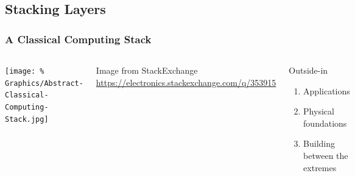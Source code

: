 \documentclass[handout]{beamer}
\begin{document}
\subsection{Stacking Layers}
\begin{frame}
  \frametitle{A Classical Computing Stack}

  \begin{columns}
    \texttt{[image: \%
      Graphics/Abstract-Classical-Computing-Stack.jpg]}
    
    Image from StackExchange \url{https://electronics.stackexchange.com/q/353915}

  
    \begin{block}{Outside-in}
      \begin{enumerate}
      \item Applications
      \item Physical foundations
      \item Building between the extremes
      \end{enumerate}
    \end{block}
  \end{columns}
\end{frame}
\end{document}
